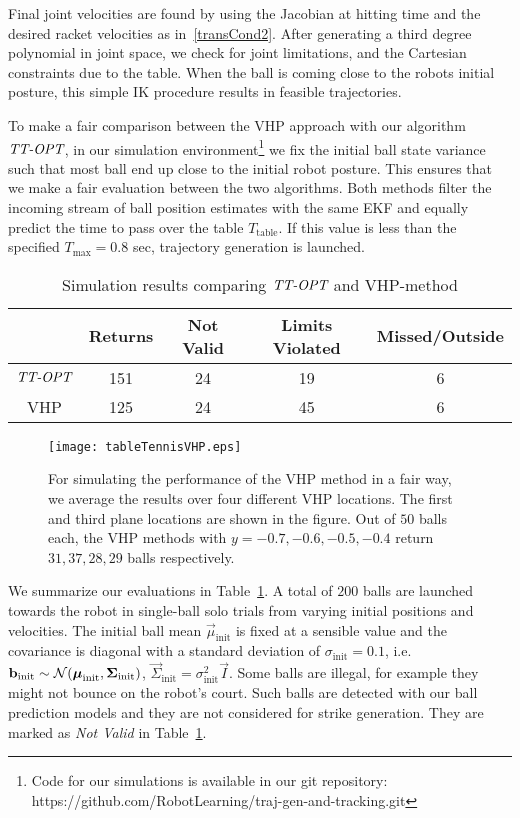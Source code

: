 Final joint velocities are found by using the Jacobian at hitting time and the desired racket velocities as in~\eqref{transCond2}. After generating a third degree polynomial in joint space, we check for joint limitations, and the Cartesian constraints due to the table. When the ball is coming close to the robots initial posture, this simple IK procedure results in feasible trajectories.

To make a fair comparison between the VHP approach with our algorithm $\emph{TT-OPT}$, in our simulation environment\footnote{Code for our simulations is available in our git repository: https://github.com/RobotLearning/traj-gen-and-tracking.git} we fix the initial ball state variance such that most ball end up close to the initial robot posture. This ensures that we make a fair evaluation between the two algorithms. Both methods filter the incoming stream of ball position estimates with the same EKF and equally predict the time to pass over the table $T_{\mathrm{table}}$. If this value is less than the specified $T_{\mathrm{max}} = 0.8$ sec, trajectory generation is launched.

\begin{table}
\renewcommand{\arraystretch}{1.3}
\caption{Simulation results comparing $\emph{TT-OPT}$ and VHP-method}
\label{tableSimResults}
\centering
\begin{tabular}{c||c|c|c|c}
& \bfseries Returns & \bfseries Not Valid  & \bfseries Limits Violated & \bfseries Missed/Outside \\
\hline
$\emph{TT-OPT}$ & 151 & 24 & 19 & 6\\
\hline
VHP & 125 & 24 & 45 & 6\\
\hline
\end{tabular}
\end{table}
%
\begin{figure}[t!]
\centering
\texttt{[image: tableTennisVHP.eps]}			
\caption{For simulating the performance of the VHP method in a fair way, we average the results over four different VHP locations. The first and third plane locations are shown in the figure. Out of $50$ balls each, the VHP methods with $y = -0.7,-0.6,-0.5,-0.4$ return $31, 37, 28, 29$ balls respectively.}
\label{vhps}
\end{figure}
%
We summarize our evaluations in Table~\ref{tableSimResults}. A total of $200$ balls are launched towards the robot in single-ball solo trials from varying initial positions and velocities. The initial ball mean $\vec{\mu}_{\mathrm{init}}$ is fixed at a sensible value and the covariance is diagonal with a standard deviation of $\sigma_{\mathrm{init}} = 0.1$, i.e. $\boldsymbol{\mathrm{b}}_{\mathrm{init}} \sim \mathcal{N}(\boldsymbol{\mathrm{\mu}}_{\mathrm{init}}, \boldsymbol{\mathrm{\Sigma}}_{\mathrm{init}})$, $\vec{\Sigma}_{\mathrm{init}} = \sigma_{\mathrm{init}}^2 \vec{I}$. Some balls are illegal, for example they might not bounce on the robot's court. Such balls are detected with our ball prediction models and they are not considered for strike generation. They are marked as \emph{Not Valid} in Table~\ref{tableSimResults}. 

